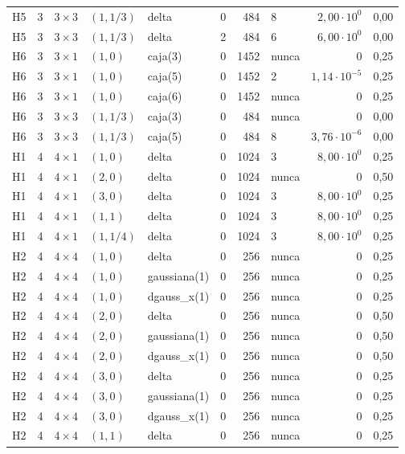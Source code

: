 \begin{tabular}{llllllrlrr}
H5 & 3 & $3\times3$ & $(1, 1/3)$ & delta & 0 & 484 & 8 & $2{,}00 \cdot 10^{0}$ & 0,00 \\
H5 & 3 & $3\times3$ & $(1, 1/3)$ & delta & 2 & 484 & 6 & $6{,}00 \cdot 10^{0}$ & 0,00 \\
H6 & 3 & $3\times1$ & $(1, 0)$ & caja(3) & 0 & 1452 & nunca & $0$ & 0,25 \\
H6 & 3 & $3\times1$ & $(1, 0)$ & caja(5) & 0 & 1452 & 2 & $1{,}14 \cdot 10^{-5}$ & 0,25 \\
H6 & 3 & $3\times1$ & $(1, 0)$ & caja(6) & 0 & 1452 & nunca & $0$ & 0,25 \\
H6 & 3 & $3\times3$ & $(1, 1/3)$ & caja(3) & 0 & 484 & nunca & $0$ & 0,00 \\
H6 & 3 & $3\times3$ & $(1, 1/3)$ & caja(5) & 0 & 484 & 8 & $3{,}76 \cdot 10^{-6}$ & 0,00 \\
H1 & 4 & $4\times1$ & $(1, 0)$ & delta & 0 & 1024 & 3 & $8{,}00 \cdot 10^{0}$ & 0,25 \\
H1 & 4 & $4\times1$ & $(2, 0)$ & delta & 0 & 1024 & nunca & $0$ & 0,50 \\
H1 & 4 & $4\times1$ & $(3, 0)$ & delta & 0 & 1024 & 3 & $8{,}00 \cdot 10^{0}$ & 0,25 \\
H1 & 4 & $4\times1$ & $(1, 1)$ & delta & 0 & 1024 & 3 & $8{,}00 \cdot 10^{0}$ & 0,25 \\
H1 & 4 & $4\times1$ & $(1, 1/4)$ & delta & 0 & 1024 & 3 & $8{,}00 \cdot 10^{0}$ & 0,25 \\
H2 & 4 & $4\times4$ & $(1, 0)$ & delta & 0 & 256 & nunca & $0$ & 0,25 \\
H2 & 4 & $4\times4$ & $(1, 0)$ & gaussiana(1) & 0 & 256 & nunca & $0$ & 0,25 \\
H2 & 4 & $4\times4$ & $(1, 0)$ & dgauss\_x(1) & 0 & 256 & nunca & $0$ & 0,25 \\
H2 & 4 & $4\times4$ & $(2, 0)$ & delta & 0 & 256 & nunca & $0$ & 0,50 \\
H2 & 4 & $4\times4$ & $(2, 0)$ & gaussiana(1) & 0 & 256 & nunca & $0$ & 0,50 \\
H2 & 4 & $4\times4$ & $(2, 0)$ & dgauss\_x(1) & 0 & 256 & nunca & $0$ & 0,50 \\
H2 & 4 & $4\times4$ & $(3, 0)$ & delta & 0 & 256 & nunca & $0$ & 0,25 \\
H2 & 4 & $4\times4$ & $(3, 0)$ & gaussiana(1) & 0 & 256 & nunca & $0$ & 0,25 \\
H2 & 4 & $4\times4$ & $(3, 0)$ & dgauss\_x(1) & 0 & 256 & nunca & $0$ & 0,25 \\
H2 & 4 & $4\times4$ & $(1, 1)$ & delta & 0 & 256 & nunca & $0$ & 0,25 \\

\end{tabular}
